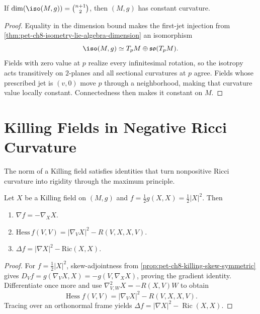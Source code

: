 \begin{theorem}
  \label{thm:pet-ch8-maximal-symmetry-constant-curvature}

  If $\dim(\iso(M,g))=\binom{n+1}2$, then $(M,g)$ has constant curvature.
\end{theorem}
\begin{proof}
  \sketch
  Equality in the dimension bound makes the first-jet injection from
  \cref{thm:pet-ch8-isometry-lie-algebra-dimension} an isomorphism
  \[
    \iso(M,g)\simeq T_pM\oplus\mathfrak{so}(T_pM).
  \]
  Fields with zero value at \(p\) realize every infinitesimal rotation, so the
  isotropy acts transitively on \(2\)-planes and all sectional curvatures at
  \(p\) agree. Fields whose prescribed jet is \((v,0)\) move \(p\) through a
  neighborhood, making that curvature value locally constant. Connectedness
  then makes it constant on \(M\).
\end{proof}

\section{Killing Fields in Negative Ricci Curvature}

The norm of a Killing field satisfies identities that turn nonpositive Ricci
curvature into rigidity through the maximum principle.

\begin{proposition}
  \label{prop:pet-ch8-killing-norm-formulas}

  Let $X$ be a Killing field on $(M,g)$ and $f=\tfrac12g(X,X)=\tfrac12|X|^2$.
  Then
  \begin{enumerate}
    \item $\nabla f=-\nabla_XX$.
    \item $\mathrm{Hess}\,f(V,V)=|\nabla_VX|^2-R(V,X,X,V)$.
    \item $\Delta f=|\nabla X|^2-\mathrm{Ric}(X,X)$.
  \end{enumerate}
\end{proposition}
\begin{proof}
  \sketch
  For \(f=\tfrac12|X|^2\), skew-adjointness from
  \cref{prop:pet-ch8-killing-skew-symmetric} gives
  \(D_Vf=g(\nabla_VX,X)=-g(V,\nabla_XX)\), proving the gradient identity.
  Differentiate once more and use
  \(\nabla^2_{V,W}X=-R(X,V)W\) to obtain
  \[
    \operatorname{Hess}f(V,V)=|\nabla_VX|^2-R(V,X,X,V).
  \]
  Tracing over an orthonormal frame yields
  \(\Delta f=|\nabla X|^2-\operatorname{Ric}(X,X)\).
\end{proof}

